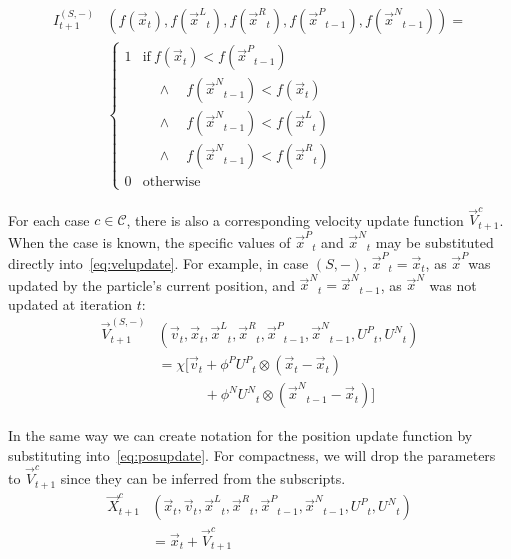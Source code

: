 \documentclass[journal,letterpaper]{IEEEtran}
\providecommand{\pers}{\ensuremath{P}}
\providecommand{\neigh}{\ensuremath{N}}
\providecommand{\leftind}{\ensuremath{L}}
\providecommand{\rightind}{\ensuremath{R}}
\providecommand{\nURand}{\ensuremath{U^\neigh}}
\providecommand{\pURand}{\ensuremath{U^\pers}}
\providecommand{\ppos}{\ensuremath{\Vec{x}}}
\providecommand{\pvel}{\ensuremath{\Vec{v}}}
\providecommand{\nbest}{\ensuremath{\Vec{x}^\neigh}}
\providecommand{\pbest}{\ensuremath{\Vec{x}^\pers}}
\providecommand{\constriction}{\ensuremath{\chi}}
\providecommand{\ncoeff}{\ensuremath{\phi^\neigh}}
\providecommand{\pcoeff}{\ensuremath{\phi^\pers}}
\providecommand{\ofunc}{\ensuremath{f}}
\providecommand{\indic}{\ensuremath{I}}
\providecommand{\specvel}{\ensuremath{\vec{V}}}
\providecommand{\specpos}{\ensuremath{\vec{X}}}
\providecommand{\leftn}{\ensuremath{\Vec{x}^\leftind}}
\providecommand{\rightn}{\ensuremath{\Vec{x}^\rightind}}
\providecommand{\caseset}{\ensuremath{\mathcal{C}}}
\providecommand{\casegen}{\ensuremath{c}}
\providecommand{\casexn}{\ensuremath{(S,-)}}
\begin{document}
\begin{align}
  \nonumber
	\indic_{t+1}^{\casexn} & (\ofunc ( \ppos_{t} ) ,\ofunc(\leftn_{t}),
	\ofunc(\rightn_{t}) ,\ofunc(\pbest_{t-1}) ,\ofunc(\nbest_{t-1}))= \\
  \label{eq:deficasexn}
	&\begin{cases}
	   1 & \text{if} \ \ofunc(\ppos_{t}) < \ofunc(\pbest_{t-1}) \\
	   &\quad \wedge \quad \ofunc(\nbest_{t-1}) < \ofunc(\ppos_{t}) \\
	   &\quad \wedge \quad \ofunc(\nbest_{t-1}) < \ofunc(\leftn_{t}) \\
	   &\quad \wedge \quad \ofunc(\nbest_{t-1}) < \ofunc(\rightn_{t}) \\
	   0 & \text{otherwise}
	\end{cases}
\end{align}

For each case $\casegen \in \caseset$, there is also a corresponding
velocity update function $\specvel_{t+1}^{\casegen}$.  When the case is
known, the specific values of $\pbest_t$ and $\nbest_t$ may be substituted
directly into~\eqref{eq:velupdate}.  For example, in case $\casexn$,
$\pbest_{t}=\ppos_{t}$, as \pbest was updated by the particle's current
position, and $\nbest_{t}=\nbest_{t-1}$, as $\nbest$ was not updated at
iteration $t$:
\begin{align}
\nonumber
	\specvel_{t+1}^{\casexn} & (\pvel_t, \ppos_{t}, \leftn_{t}, \rightn_{t},
	\pbest_{t-1}, \nbest_{t-1}, \pURand_{t}, \nURand_{t}) \\
\nonumber
		&= \constriction \bigl[ \pvel_{t} +
			\pcoeff\pURand_{t}\otimes(\ppos_{t} - \ppos_{t}) \\
\label{eq:defvcasexn}
			& \quad \quad \quad \; + \ncoeff\nURand_{t}\otimes(\nbest_{t-1} -
			\ppos_{t}) \bigr]
\end{align}

In the same way we can create notation for the position update function by
substituting into~\eqref{eq:posupdate}.  For compactness, we will drop the
parameters to $\specvel_{t+1}^{\casegen}$ since they can be inferred from the
subscripts.
\begin{align}
\label{eq:defpcasegen}
	\specpos_{t+1}^{\casegen} & (\ppos_{t}, \pvel_{t}, \leftn_{t},
	\rightn_{t} ,\pbest_{t-1} ,\nbest_{t-1}, \pURand_{t}, \nURand_{t}) \\
\nonumber
	& = \ppos_{t} + \specvel_{t+1}^{\casegen}
\end{align}
\end{document}
